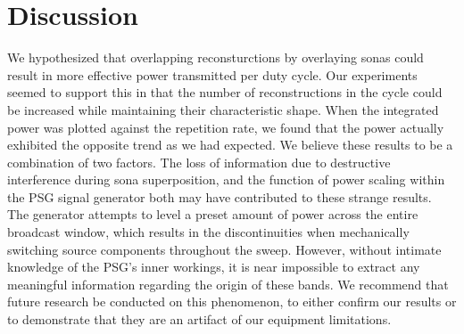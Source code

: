 \section{Discussion}
\label{sec:overlapping-discussion}

We hypothesized that overlapping reconsturctions by overlaying sonas could result in more effective power transmitted per duty cycle. Our experiments seemed to support this in that the number of reconstructions in the cycle could be increased while maintaining their characteristic shape. When the integrated power was plotted against the repetition rate, we found that the power actually exhibited the opposite trend as we had expected. We believe these results to be a combination of two factors. The loss of information due to destructive interference during sona superposition, and the function of power scaling within the PSG signal generator both may have contributed to these strange results. The generator attempts to level a preset amount of power across the entire broadcast window, which results in the discontinuities when mechanically switching source components throughout the sweep. However, without intimate knowledge of the PSG's inner workings, it is near impossible to extract any meaningful information regarding the origin of these bands. We recommend that future research be conducted on this phenomenon, to either confirm our results or to demonstrate that they are an artifact of our equipment limitations.
